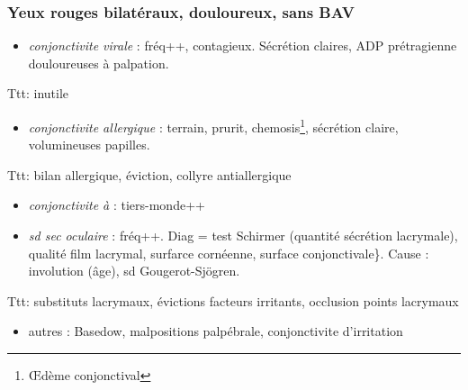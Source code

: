 \documentclass[11pt]{article}
\def\ttt{\hspace*{1cm}Ttt: }
\begin{document}
\subsubsection{Yeux rouges bilatéraux, douloureux, sans BAV}
\label{sec:orge1c403c}
\begin{itemize}
\item \emph{conjonctivite virale} : fréq++, contagieux. Sécrétion claires, ADP prétragienne
douloureuses à palpation.
\end{itemize}
\ttt inutile
\begin{itemize}
\item \emph{conjonctivite allergique} : terrain, prurit, chemosis\footnote{\OE{}dème conjonctival}, sécrétion claire,
volumineuses papilles.
\end{itemize}
\ttt bilan allergique, éviction, collyre antiallergique
\begin{itemize}
\item \emph{conjonctivite à } : tiers-monde++
\item \emph{sd sec oculaire} : fréq++. Diag = test Schirmer (quantité sécrétion lacrymale),
qualité film lacrymal, surfarce cornéenne, surface conjonctivale\}. Cause :
involution (âge), sd Gougerot-Sjögren.
\end{itemize}
\ttt substituts lacrymaux, évictions
  facteurs irritants, occlusion points lacrymaux
\begin{itemize}
\item autres : Basedow, malpositions palpébrale, conjonctivite d'irritation
\end{itemize}
\end{document}

